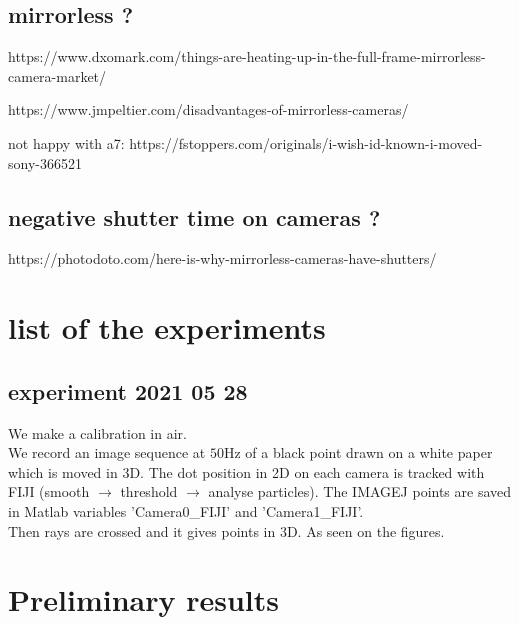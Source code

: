 \documentclass[twocolumn,amsmath,amssymb,floatfix]{revtex4}
\begin{document}
\subsection{mirrorless ?}

https://www.dxomark.com/things-are-heating-up-in-the-full-frame-mirrorless-camera-market/

https://www.jmpeltier.com/disadvantages-of-mirrorless-cameras/

not happy with a7: https://fstoppers.com/originals/i-wish-id-known-i-moved-sony-366521


\subsection{negative shutter time on cameras ?}
https://photodoto.com/here-is-why-mirrorless-cameras-have-shutters/



\section{list of the experiments}

\subsection{experiment 2021 05 28}

We make a calibration in air.\\
We record an image sequence at $50$Hz of a black point drawn on a white paper which is moved in $3$D. The dot position in 2D on each camera is tracked with FIJI (smooth $\rightarrow$ threshold $\rightarrow$ analyse particles). The IMAGEJ points are saved in Matlab variables 'Camera0\_FIJI' and 'Camera1\_FIJI'. \\
Then rays are crossed and it gives points in 3D. As seen on the figures.

\section{Preliminary results}
\end{document}
